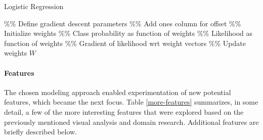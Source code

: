 \documentclass[fleqn,10pt]{SelfArx} %
\begin{document}
\begin{algorithm}
	\caption{Logistic Regression}
	\label{alg:2}
	\begin{algorithmic}[1]
		\STATE \%\% Define gradient descent parameters
		\STATE \%\% Add ones column for offset
		\STATE \%\% Initialize weights
		\STATE \%\% Class probability as function of weights
		\STATE \%\% Likelihood as function of weights
		\STATE \%\% Gradient of likelihood wrt weight vectors
		\STATE \%\% Update weights
		\ENDWHILE
		\RETURN $W$
	\end{algorithmic}
\end{algorithm}

\paragraph{Features} The chosen modeling approach enabled experimentation of new potential features, which became the next focus.  Table \ref{more-features} summarizes, in some detail, a few of the more interesting features that were explored based on the previously mentioned visual analysis and domain research.  Additional features are briefly described below.
\end{document}
